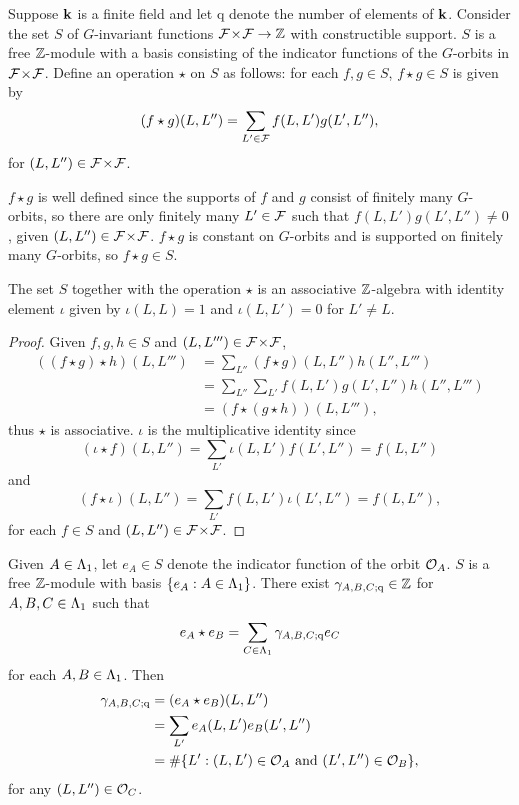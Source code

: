 \documentclass[a4paper, 11pt, twoside]{report}
\begin{document}
Suppose $\mathbf{k}$ is a finite field and let $\mathrm{q}$ denote the number of elements of $\mathbf{k}$. Consider the set $S$ of $G$-invariant functions ${\mathcal{F}\!\times\!\mathcal{F}}\to\mathbb{Z}$ with constructible support. $S$ is a free $\mathbb{Z}$-module with a basis consisting of the indicator functions of the $G$-orbits in ${\mathcal{F}\!\times\!\mathcal{F}}$. Define an operation $\star$ on $S$ as follows: for each $f,g\in S$, $f\star g\in S$ is given by
\begin{equation*}
(f\star g)(L,L'') = \sum_{L'\in\mathcal{F}} f(L,L')g(L',L''),
\end{equation*}
for $(L,L'')\in{\mathcal{F}\!\times\!\mathcal{F}}$. 

$f\star g$ is well defined since the supports of $f$ and $g$ consist of finitely many $G$-orbits, so there are only finitely many $L'\in\mathcal{F}$ such that $f(L,L')g(L',L'')\neq 0$, given $(L,L'')\in{\mathcal{F}\!\times\!\mathcal{F}}$. $f\star g$ is constant on $G$-orbits and is supported on finitely many $G$-orbits, so $f\star g\in S$.

\begin{lemma}\label{lemma:convolution-algebra}
The set $S$ together with the operation $\star$ is an associative $\mathbb{Z}$-algebra with identity element $\iota$ given by $\iota(L,L) = 1$ and $\iota(L,L')=0$ for $L'\neq L$.
\end{lemma}

\begin{proof}
Given $f,g,h\in S$ and $(L,L''')\in{\mathcal{F}\!\times\!\mathcal{F}}$,
\begin{align*}
((f\star g)\star h)(L,L''')
&= \sum_{L''} (f\star g)(L,L'')h(L'',L''')\\
&= \sum_{L''}\sum_{L'} f(L,L')g(L',L'')h(L'',L''')\\
&= (f\star (g\star h))(L,L'''),
\end{align*}
thus $\star$ is associative. $\iota$ is the multiplicative identity since
\begin{equation*}
(\iota\star f)(L,L'') = \sum_{L'}\iota(L,L')f(L',L'') = f(L,L'')
\end{equation*}
and
\begin{equation*}
(f\star\iota)(L,L'') = \sum_{L'}f(L,L')\iota(L',L'') = f(L,L''),
\end{equation*}
for each $f\in S$ and $(L,L'')\in{\mathcal{F}\!\times\!\mathcal{F}}$.
\end{proof}

Given $A\in\Lambda_1{}$, let $e_A\in S$ denote the indicator function of the orbit $\mathcal{O}_{A}$. $S$ is a free $\mathbb{Z}$-module with basis $\{e_A:A\in\Lambda_1{}\}$. There exist $\gamma_{A,B,C;\mathrm{q}}\in\mathbb{Z}$ for $A,B,C\in\Lambda_1{}$ such that
\begin{equation*}
e_A\star e_B = \sum_{C\in\Lambda_1{}} \gamma_{A,B,C;\mathrm{q}}e_C
\end{equation*}
for each $A,B\in\Lambda_1{}$. Then
\begin{align*}
\gamma_{A,B,C;\mathrm{q}}
&=(e_A\star e_B)(L,L'')\\
&= \sum_{L'} e_A(L,L')e_B(L',L'')\\
&= \#\{L':(L,L')\in\mathcal{O}_{A} \text{ and }(L',L'')\in\mathcal{O}_{B}\},
\end{align*}
for any $(L,L'')\in\mathcal{O}_{C}$.
\end{document}
